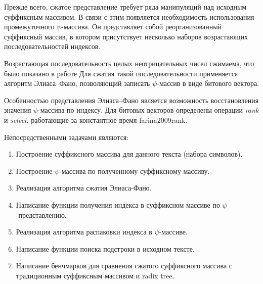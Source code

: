 
Прежде всего, сжатое представление требует ряда манипуляций над исходным суффиксным массивом.
В связи с этим появляется необходимость использования промежуточного $\psi$-массива.
Он представляет собой реорганизованный суффиксный массив,
в котором присутствует несколько наборов возрастающих последовательностей индексов.

Возрастающая последовательность целых неотрицательных чисел сжимаема, что было показано в работе \cite{pibiri2014dynamic}
Для сжатия такой последовательности применяется алгоритм Элиаса--Фано, позволяющий записать
$\psi$-массив в виде битового вектора.

Особенностью представления Элиаса--Фано является возможность восстановления значения $\psi$-массива
по индексу. Для битовых векторов определены операции \emph{rank} и \emph{select},
работающие за константное время farina2009rank.

Непосредственными задачами являются:

\begin{enumerate}
    \item Построение суффиксного массива для данного текста (набора символов).
    \item Построение $\psi$-массива по полученному суффиксному массиву.
    \item Реализация алгоритма сжатия Элиаса-Фано.
    \item Написание функции получения индекса в суффиксном массиве по $\psi$-представлению.
    \item Реализация алгоритма распаковки индекса в $\psi$-массиве.
    \item Написание функции поиска подстроки в исходном тексте.
    \item Написание бенчмарков для сравнения сжатого суффиксного массива
    с традиционным суффиксным массивом и radix tree.
\end{enumerate}


